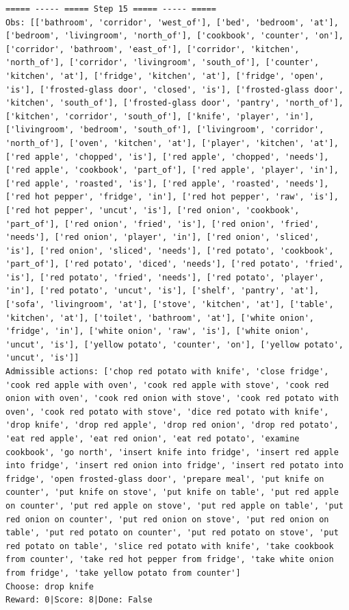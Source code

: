 \documentclass[11pt]{article}
\begin{document}
\begin{lstlisting}
===== ----- ===== Step 15 ===== ----- =====
Obs: [['bathroom', 'corridor', 'west_of'], ['bed', 'bedroom', 'at'], ['bedroom', 'livingroom', 'north_of'], ['cookbook', 'counter', 'on'], ['corridor', 'bathroom', 'east_of'], ['corridor', 'kitchen', 'north_of'], ['corridor', 'livingroom', 'south_of'], ['counter', 'kitchen', 'at'], ['fridge', 'kitchen', 'at'], ['fridge', 'open', 'is'], ['frosted-glass door', 'closed', 'is'], ['frosted-glass door', 'kitchen', 'south_of'], ['frosted-glass door', 'pantry', 'north_of'], ['kitchen', 'corridor', 'south_of'], ['knife', 'player', 'in'], ['livingroom', 'bedroom', 'south_of'], ['livingroom', 'corridor', 'north_of'], ['oven', 'kitchen', 'at'], ['player', 'kitchen', 'at'], ['red apple', 'chopped', 'is'], ['red apple', 'chopped', 'needs'], ['red apple', 'cookbook', 'part_of'], ['red apple', 'player', 'in'], ['red apple', 'roasted', 'is'], ['red apple', 'roasted', 'needs'], ['red hot pepper', 'fridge', 'in'], ['red hot pepper', 'raw', 'is'], ['red hot pepper', 'uncut', 'is'], ['red onion', 'cookbook', 'part_of'], ['red onion', 'fried', 'is'], ['red onion', 'fried', 'needs'], ['red onion', 'player', 'in'], ['red onion', 'sliced', 'is'], ['red onion', 'sliced', 'needs'], ['red potato', 'cookbook', 'part_of'], ['red potato', 'diced', 'needs'], ['red potato', 'fried', 'is'], ['red potato', 'fried', 'needs'], ['red potato', 'player', 'in'], ['red potato', 'uncut', 'is'], ['shelf', 'pantry', 'at'], ['sofa', 'livingroom', 'at'], ['stove', 'kitchen', 'at'], ['table', 'kitchen', 'at'], ['toilet', 'bathroom', 'at'], ['white onion', 'fridge', 'in'], ['white onion', 'raw', 'is'], ['white onion', 'uncut', 'is'], ['yellow potato', 'counter', 'on'], ['yellow potato', 'uncut', 'is']]
Admissible actions: ['chop red potato with knife', 'close fridge', 'cook red apple with oven', 'cook red apple with stove', 'cook red onion with oven', 'cook red onion with stove', 'cook red potato with oven', 'cook red potato with stove', 'dice red potato with knife', 'drop knife', 'drop red apple', 'drop red onion', 'drop red potato', 'eat red apple', 'eat red onion', 'eat red potato', 'examine cookbook', 'go north', 'insert knife into fridge', 'insert red apple into fridge', 'insert red onion into fridge', 'insert red potato into fridge', 'open frosted-glass door', 'prepare meal', 'put knife on counter', 'put knife on stove', 'put knife on table', 'put red apple on counter', 'put red apple on stove', 'put red apple on table', 'put red onion on counter', 'put red onion on stove', 'put red onion on table', 'put red potato on counter', 'put red potato on stove', 'put red potato on table', 'slice red potato with knife', 'take cookbook from counter', 'take red hot pepper from fridge', 'take white onion from fridge', 'take yellow potato from counter']
Choose: drop knife
Reward: 0|Score: 8|Done: False


\end{lstlisting}
\end{document}
